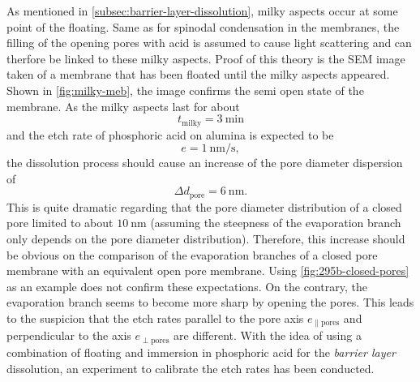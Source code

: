 \documentclass[../thesis.tex]{subfiles}
\begin{document}
        As mentioned in \cref{subsec:barrier-layer-dissolution}, milky aspects occur at some point of the floating. Same as for spinodal condensation in the membranes, the filling of the opening pores with acid is assumed to cause light scattering and can therfore be linked to these milky aspects. Proof of this theory is the SEM image taken of a membrane that has been floated until the milky aspects appeared. Shown in \cref{fig:milky-meb}, the image confirms the semi open state of the membrane. As the milky aspects last for about
        \begin{equation*}
          t_\mathrm{milky} =\SI{3}{\minute}
        \end{equation*}
        and the etch rate of phosphoric acid on alumina is expected to be
        \begin{equation*}
          e=\SI{1}{\nano\meter\per\second},
        \end{equation*}
        the  dissolution process should cause an increase of the pore diameter dispersion of
        \begin{equation*}
          \Delta d_\mathrm{pore} = \SI{6}{\nano\meter}.
        \end{equation*}
        This is quite dramatic regarding that the pore diameter distribution of a closed pore limited to about $\SI{10}{\nano\meter}$ (assuming the steepness of the evaporation branch only depends on the pore diameter distribution). Therefore, this increase should be obvious on the comparison of the evaporation branches of a closed pore membrane with an equivalent open pore membrane. Using \cref{fig:295b-closed-pores} as an example does not confirm these expectations. On the contrary, the evaporation branch seems to become more sharp by opening the pores. This leads to the suspicion that the etch rates parallel to the pore axis $e_\mathrm{\parallel pores}$ and perpendicular to the axis $e_\mathrm{\perp pores}$ are different. With the idea of using a combination of floating and immersion in phosphoric acid for the \textit{barrier layer} dissolution, an experiment to calibrate the etch rates has been conducted.
        \medskip
\end{document}
